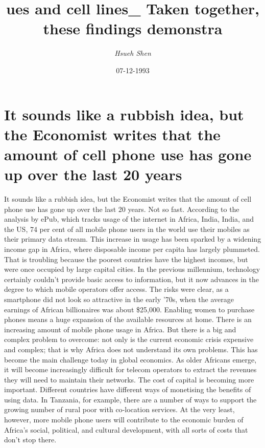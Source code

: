 \documentclass{article}%
\title{ues and cell lines\_ Taken together, these findings demonstra}%
\author{\textit{Hsueh Shen}}%
\date{07-12-1993}%
\begin{document}
%
\normalsize%
\maketitle%
\section{It sounds like a rubbish idea, but the Economist writes that the amount of cell phone use has gone up over the last 20 years}%
\label{sec:Itsoundslikearubbishidea,buttheEconomistwritesthattheamountofcellphoneusehasgoneupoverthelast20years}%
It sounds like a rubbish idea, but the Economist writes that the amount of cell phone use has gone up over the last 20 years. Not so fast. According to the analysis by ePub, which tracks usage of the internet in Africa, India, India, and the US, 74 per cent of all mobile phone users in the world use their mobiles as their primary data stream.\newline%
This increase in usage has been sparked by a widening income gap in Africa, where disposable income per capita has largely plummeted. That is troubling because the poorest countries have the highest incomes, but were once occupied by large capital cities. In the previous millennium, technology certainly couldn’t provide basic access to information, but it now advances in the degree to which mobile operators offer access. The risks were clear, as a smartphone did not look so attractive in the early ’70s, when the average earnings of African billionaires was about \$25,000.\newline%
Enabling women to purchase phones means a huge expansion of the available resources at home. There is an increasing amount of mobile phone usage in Africa. But there is a big and complex problem to overcome: not only is the current economic crisis expensive and complex; that is why Africa does not understand its own problems. This has become the main challenge today in global economics.\newline%
As older Africans emerge, it will become increasingly difficult for telecom operators to extract the revenues they will need to maintain their networks. The cost of capital is becoming more important. Different countries have different ways of monetising the benefits of using data. In Tanzania, for example, there are a number of ways to support the growing number of rural poor with co{-}location services.\newline%
At the very least, however, more mobile phone users will contribute to the economic burden of Africa’s social, political, and cultural development, with all sorts of costs that don’t stop there.\newline%
\end{document}
